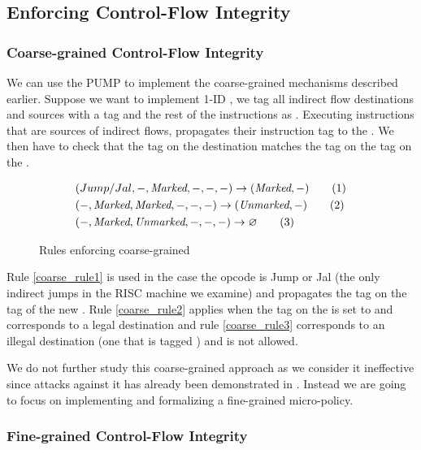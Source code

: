 \subsection{Enforcing Control-Flow Integrity}\label{sec:cfi_enforce}

\subsubsection{Coarse-grained Control-Flow Integrity}\label{sec:cfi_coarse}
We can use the PUMP to implement the coarse-grained \CFI mechanisms described
earlier. Suppose we want to implement 1-ID \CFI, we tag all indirect flow 
destinations and sources with a tag \MARK and the rest of the instructions as 
\UNMARK. Executing instructions that are sources of indirect flows, propagates
their instruction tag to the \pc. We then have to check that the tag on the
destination matches the tag on the tag on the \pc.

\begin{figure}[!htpb]
\begin{align}
 & (Jump/Jal, -,\emph{Marked}, -, -, -) \rightarrow (\emph{Marked},-) \label{coarse_rule1} 
\tag{1} \\
 & (-, \emph{Marked}, \emph{Marked}, -, -, -) \rightarrow (\emph{Unmarked}, -) \label{coarse_rule2}
\tag{2} \\
 & (-, \emph{Marked}, \emph{Unmarked}, -, -, -) \rightarrow \varnothing \label{coarse_rule3} 
\tag{3}
\end{align}
\caption{Rules enforcing coarse-grained \CFI}
\end{figure}


Rule \ref{coarse_rule1} is used in the case the opcode is Jump or Jal (the only 
indirect jumps in the RISC machine we examine) and propagates the \MARKname tag on
the tag of the new \pc. Rule \ref{coarse_rule2} applies when the tag on the \pc
is set to \MARKname and corresponds to a legal destination and rule
\ref{coarse_rule3} corresponds to an illegal destination (\IE one that is 
tagged \UNMARK) and is not allowed.

We do not further study this coarse-grained approach as we consider it 
ineffective since attacks against it has already been demonstrated in 
\cite{outofcontrol_ieeesp2014}. Instead we are going to focus on implementing
and formalizing a fine-grained \CFI micro-policy.

\subsubsection{Fine-grained Control-Flow Integrity}\label{sec:cfi_fine}


